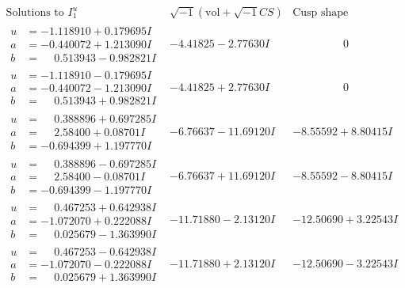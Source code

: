 \documentclass[1p]{elsarticle_modified}
\theoremstyle{definition}
\newcommand{\I}{\sqrt{-1}}
\begin{document}
$$\begin{array}{c|c|c}  
\text{Solutions to }I^u_{1}& \I (\text{vol} + \sqrt{-1}CS) & \text{Cusp shape}\\
 \hline 
\begin{aligned}
u &= -1.118910 + 0.179695 I \\
a &= -0.440072 + 1.213090 I \\
b &= \phantom{-}0.513943 - 0.982821 I\end{aligned}
 & -4.41825 - 2.77630 I & \phantom{-0.000000 } 0 \\ \hline\begin{aligned}
u &= -1.118910 - 0.179695 I \\
a &= -0.440072 - 1.213090 I \\
b &= \phantom{-}0.513943 + 0.982821 I\end{aligned}
 & -4.41825 + 2.77630 I & \phantom{-0.000000 } 0 \\ \hline\begin{aligned}
u &= \phantom{-}0.388896 + 0.697285 I \\
a &= \phantom{-}2.58400 + 0.08701 I \\
b &= -0.694399 + 1.197770 I\end{aligned}
 & -6.76637 - 11.69120 I & -8.55592 + 8.80415 I \\ \hline\begin{aligned}
u &= \phantom{-}0.388896 - 0.697285 I \\
a &= \phantom{-}2.58400 - 0.08701 I \\
b &= -0.694399 - 1.197770 I\end{aligned}
 & -6.76637 + 11.69120 I & -8.55592 - 8.80415 I \\ \hline\begin{aligned}
u &= \phantom{-}0.467253 + 0.642938 I \\
a &= -1.072070 + 0.222088 I \\
b &= \phantom{-}0.025679 - 1.363990 I\end{aligned}
 & -11.71880 - 2.13120 I & -12.50690 + 3.22543 I \\ \hline\begin{aligned}
u &= \phantom{-}0.467253 - 0.642938 I \\
a &= -1.072070 - 0.222088 I \\
b &= \phantom{-}0.025679 + 1.363990 I\end{aligned}
 & -11.71880 + 2.13120 I & -12.50690 - 3.22543 I \\ \hline\begin{aligned}

\end{aligned}
\end{array}$$
\end{document}

